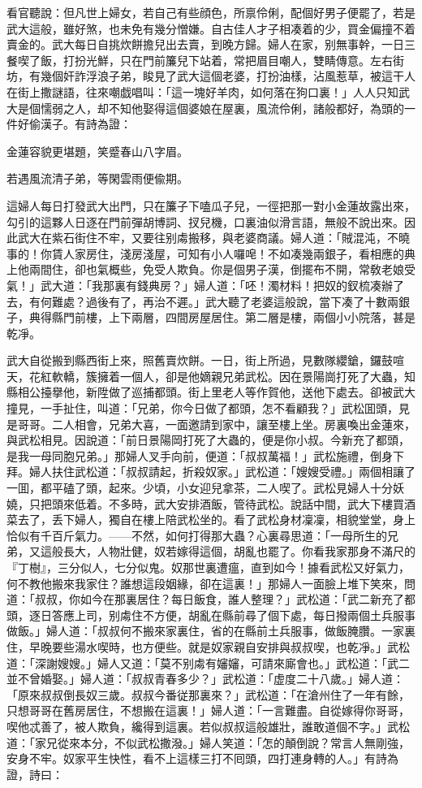 看官聽說：但凡世上婦女，若自己有些顔色，所禀伶俐，配個好男子便罷了，若是武大這般，雖好煞，也未免有幾分憎嫌。自古佳人才子相凑着的少，買金偏撞不着賣金的。武大每日自挑炊餅擔兒出去賣，到晚方歸。婦人在家，别無事幹，一日三餐喫了飯，打扮光鮮，只在門前簾兒下站着，常把眉目嘲人，雙睛傳意。左右街坊，有幾個奸詐浮浪子弟，睃見了武大這個老婆，打扮油樣，沾風惹草，被這干人在街上撒謎語，往來嘲戯唱叫：「這一塊好羊肉，如何落在狗口裏！」人人只知武大是個懦弱之人，却不知他娶得這個婆娘在屋裏，風流伶俐，諸般都好，為頭的一件好偷漢子。有詩為證：

\begin{myquote}
金蓮容貌更堪題，笑蹙春山八字眉。

若遇風流清子弟，等閑雲雨便偸期。
\end{myquote}

這婦人每日打發武大出門，只在簾子下嗑瓜子兒，一徑把那一對小金蓮故露出來，勾引的這夥人日逐在門前彈胡博詞、扠兒機，口裏油似滑言語，無般不說出來。因此武大在紫石街住不牢，又要往别䖏搬移，與老婆商議。婦人道：「賊混沌，不曉事的！你賃人家房住，淺房淺屋，可知有小人囉唣！不如凑幾兩銀子，看相應的典上他兩間住，卻也氣概些，免受人欺負。你是個男子漢，倒擺布不開，常敎老娘受氣！」武大道：「我那裏有錢典房？」婦人道：「呸！濁材料！把奴的釵梳凑辦了去，有何難處？過後有了，再治不遲。」武大聽了老婆這般說，當下凑了十數兩銀子，典得縣門前樓，上下兩層，四間房屋居住。第二層是樓，兩個小小院落，甚是乾凈。

武大自從搬到縣西街上來，照舊賣炊餅。一日，街上所過，見數隊纓鎗，鑼鼓喧天，花紅軟轎，簇擁着一個人，卻是他嫡親兄弟武松。因在景陽崗打死了大蟲，知縣相公擡擧他，新陞做了巡捕都頭。街上里老人等作賀他，送他下處去。卻被武大撞見，一手扯住，叫道：「兄弟，你今日做了都頭，怎不看顧我？」武松囬頭，見是哥哥。二人相會，兄弟大喜，一面邀請到家中，讓至樓上坐。房裏喚出金蓮來，與武松相見。因說道：「前日景陽岡打死了大蟲的，便是你小叔。今新充了都頭，是我一母同胞兄弟。」那婦人叉手向前，便道：「叔叔萬福！」武松施禮，倒身下拜。婦人扶住武松道：「叔叔請起，折殺奴家。」武松道：「嫂嫂受禮。」兩個相讓了一囬，都平磕了頭，起來。少頃，小女迎兒拿茶，二人喫了。武松見婦人十分妖嬈，只把頭來低着。不多時，武大安排酒飯，管待武松。說話中間，武大下樓買酒菜去了，丢下婦人，獨自在樓上陪武松坐的。看了武松身材凜凜，相貌堂堂，身上恰似有千百斤氣力。——不然，如何打得那大蟲？心裏尋思道：「一母所生的兄弟，又這般長大，人物壯健，奴若嫁得這個，胡亂也罷了。你看我家那身不滿尺的『丁樹』，三分似人，七分似鬼。奴那世裏遭瘟，直到如今！據看武松又好氣力，何不教他搬來我家住？誰想這段姻緣，卻在這裏！」那婦人一面臉上堆下笑來，問道：「叔叔，你如今在那裏居住？每日飯食，誰人整理？」武松道：「武二新充了都頭，逐日答應上司，别䖏住不方便，胡亂在縣前尋了個下處，每日撥兩個土兵服事做飯。」婦人道：「叔叔何不搬來家裏住，省的在縣前土兵服事，做飯腌臢。一家裏住，早晚要些湯水喫時，也方便些。就是奴家親自安排與叔叔喫，也乾凈。」武松道：「深謝嫂嫂。」婦人又道：「莫不别䖏有嬸嬸，可請來廝會也。」武松道：「武二並不曾婚娶。」婦人道：「叔叔青春多少？」武松道：「虚度二十八歲。」婦人道：「原來叔叔倒長奴三歲。叔叔今番従那裏來？」武松道：「在滄州住了一年有餘，只想哥哥在舊房居住，不想搬在這裏！」婦人道：「一言難盡。自從嫁得你哥哥，喫他忒善了，被人欺負，纔得到這裏。若似叔叔這般雄壯，誰敢道個不字。」武松道：「家兄從來本分，不似武松撒潑。」婦人笑道：「怎的顛倒說？常言人無剛強，安身不牢。奴家平生快性，看不上這樣三打不囘頭，四打連身轉的人。」有詩為證，詩曰：

